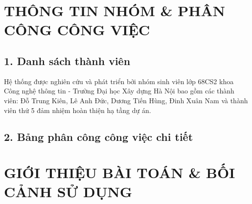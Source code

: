 \documentclass[12pt, a4paper]{article}
\begin{document}
\newpage

\tableofcontents
\newpage


\section*{THÔNG TIN NHÓM \& PHÂN CÔNG CÔNG VIỆC}

\subsection*{1. Danh sách thành viên}
Hệ thống được nghiên cứu và phát triển bởi nhóm sinh viên lớp 68CS2 khoa Công nghệ thông tin - Trường Đại học Xây dựng Hà Nội bao gồm các thành viên: Đỗ Trung Kiên, Lê Anh Đức, Dương Tiến Hùng, Đinh Xuân Nam và thành viên thứ 5 đảm nhiệm hoàn thiện hạ tầng dự án.

\subsection*{2. Bảng phân công công việc chi tiết}
\begin{table}[H]
  \centering
  \small
  \caption{Bảng phân công nhiệm vụ và tỷ lệ đóng góp thành viên}
  \label{tab:phancong}
\end{table}

\newpage
\setcounter{section}{0}

\section{GIỚI THIỆU BÀI TOÁN \& BỐI CẢNH SỬ DỤNG}
\end{document}
